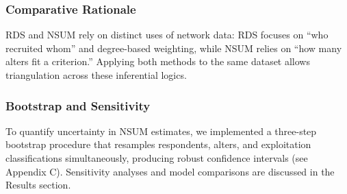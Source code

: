 \documentclass[
  12pt,
  letterpaper,
  DIV=11,
  numbers=noendperiod]{scrartcl}
\theoremstyle{plain}
\theoremstyle{definition}
\begin{document}
\subsubsection{Comparative Rationale}\label{comparative-rationale}

RDS and NSUM rely on distinct uses of network data: RDS focuses on ``who
recruited whom'' and degree-based weighting, while NSUM relies on ``how
many alters fit a criterion.'' Applying both methods to the same dataset
allows triangulation across these inferential logics.

\subsubsection{Bootstrap and
Sensitivity}\label{bootstrap-and-sensitivity}

To quantify uncertainty in NSUM estimates, we implemented a three-step
bootstrap procedure that resamples respondents, alters, and exploitation
classifications simultaneously, producing robust confidence intervals
(see Appendix C). Sensitivity analyses and model comparisons are
discussed in the Results section.


\printbibliography
\end{document}
